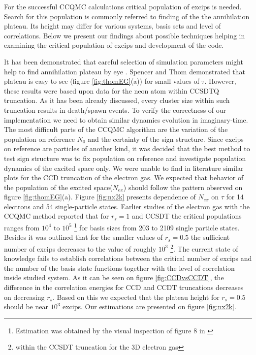 \documentclass[twoside,english]{uiofysmaster}
\begin{document}
For the successful CCQMC calculations critical population of excips is needed. Search for this population is commonly referred to finding of the the annihilation plateau. Its height may differ for various systems, basis sets and level of correlations. Below we present our findings about possible techniques helping in examining the critical population of excips and development of the code.

It has been demonstrated that careful selection of simulation parameters might help to find annihilation plateau by eye \cite{SpencerDevelopmentsstochasticcoupled2016}. Spencer and Thom demonstrated that plateau is easy to see (figure \ref{fig:thomEG}(a)) for small values of $\tau$. However, these results were based upon data for the neon atom within CCSDTQ truncation. As it has been already discussed, every cluster size within such truncation results in death/spawn events. To verify the correctness of our implementation we need to obtain similar dynamics evolution in imaginary-time.
The most difficult parts of the CCQMC algorithm are the variation of the population on reference $N_0$ and the certainty of the sign structure. Since excips on reference are particles of another kind, it was decided that the best method to test sign structure was to fix population on reference and investigate population dynamics of the excited space only. We were unable to find in literature similar plots for the CCD truncation of the electron gas. We expected that behavior of the population of the excited space($N_{ex}$) should follow the pattern observed on figure \ref{fig:thomEG}(a). Figure \ref{fig:nx2k} presents dependence of $N_{ex}$ on $\tau$ for 14 electrons and 54 single-particle states. Earlier studies of the electron gas with the CCQMC method reported that for $r_s = 1$ and CCSDT the critical populations ranges from $10^4$ to $10^5$ \footnote{Estimation was obtained by the visual inspection of figure 8 in \cite{SpencerDevelopmentsstochasticcoupled2016}} for basis sizes from 203 to 2109 single particle states. Besides it was outlined that for the smaller values of $r_s=0.5$ the sufficient number of excips decreases to the value of roughly $10^3$ \footnote{within the CCSDT truncation for the 3D electron gas}. The current state of knowledge fails to establish correlations between the critical number of excips and the number of the basis state functions together with the level of correlation inside studied system. As it can be seen on figure \ref{fig:CCDvsCCDT}, the difference in the correlation energies for CCD and CCDT truncations decreases on decreasing $r_s$. Based on this we expected that the plateau height for $r_s=0.5$ should be near $10^3$ excips. Our estimations are presented on figure \ref{fig:nx2k}.
\end{document}
